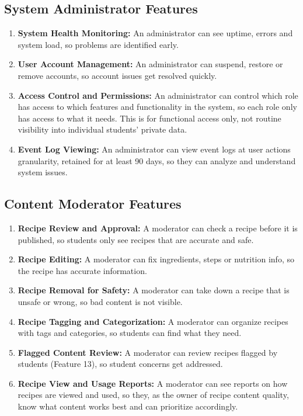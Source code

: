 \documentclass[10pt,letterpaper]{article}
\begin{document}
\subsection{System Administrator Features}
\begin{enumerate}[leftmargin=1.7em, start=19]
  \item \textbf{System Health Monitoring:} An administrator can see uptime, errors and system load, so problems are identified early.
  \item \textbf{User Account Management:} An administrator can suspend, restore or remove accounts, so account issues get resolved quickly.
  \item \textbf{Access Control and Permissions:} An administrator can control which role has access to which features and functionality in the system, so each role only has access to what it needs. This is for functional access only, not routine visibility into individual students' private data.
  \item \textbf{Event Log Viewing:} An administrator can view event logs at user actions granularity, retained for at least 90 days, so they can analyze and understand system issues.
\end{enumerate}

\subsection{Content Moderator Features}
\begin{enumerate}[leftmargin=1.7em, start=23]
  \item \textbf{Recipe Review and Approval:} A moderator can check a recipe before it is published, so students only see recipes that are accurate and safe.
  \item \textbf{Recipe Editing:} A moderator can fix ingredients, steps or nutrition info, so the recipe has accurate information.
  \item \textbf{Recipe Removal for Safety:} A moderator can take down a recipe that is unsafe or wrong, so bad content is not visible.
  \item \textbf{Recipe Tagging and Categorization:} A moderator can organize recipes with tags and categories, so students can find what they need.
  \item \textbf{Flagged Content Review:} A moderator can review recipes flagged by students (Feature 13), so student concerns get addressed.
  \item \textbf{Recipe View and Usage Reports:} A moderator can see reports on how recipes are viewed and used, so they, as the owner of recipe content quality, know what content works best and can prioritize accordingly.
\end{enumerate}
\end{document}
